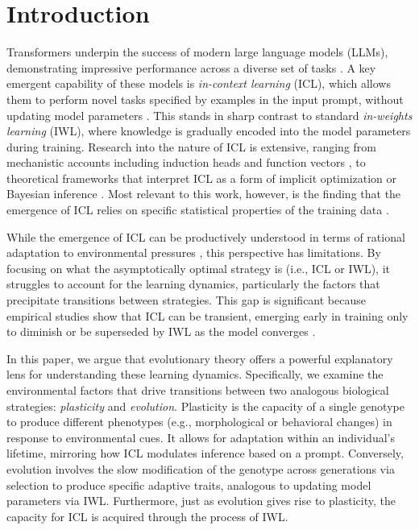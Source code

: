 \section{Introduction}

Transformers \cite{vaswani2017attention} underpin the success of modern large language models (LLMs), demonstrating impressive performance across a diverse set of tasks \cite{brown2020language}. A key emergent capability of these models is \textit{in-context learning} (ICL), which allows them to perform novel tasks specified by examples in the input prompt, without updating model parameters \cite{brown2020language, dong2022survey, liu2023pre}. This stands in sharp contrast to standard \textit{in-weights learning} (IWL), where knowledge is gradually encoded into the model parameters during training.
Research into the nature of ICL is extensive, ranging from mechanistic accounts including induction heads \cite{olsson2022context} and function vectors \cite{todd2023function}, to theoretical frameworks that interpret ICL as a form of implicit optimization or Bayesian inference \cite{von2023transformers, dai2022can, xie2021explanation}. Most relevant to this work, however, is the finding that the emergence of ICL relies on specific statistical properties of the training data \cite{chan2022data}.

While the emergence of ICL can be productively understood in terms of rational adaptation to environmental pressures \cite{wurgaft2025context}, this perspective has limitations. By focusing on what the asymptotically optimal strategy is (i.e., ICL or IWL), it struggles to account for the learning dynamics, particularly the factors that precipitate transitions between strategies. This gap is significant because empirical studies show that ICL can be transient, emerging early in training only to diminish or be superseded by IWL as the model converges \cite{singh2023transient}.

In this paper, we argue that evolutionary theory offers a powerful explanatory lens for understanding these learning dynamics. Specifically, we examine the environmental factors that drive transitions between two analogous biological strategies: \textit{plasticity} and \textit{evolution}. Plasticity is the capacity of a single genotype to produce different phenotypes (e.g., morphological or behavioral changes) in response to environmental cues. It allows for adaptation within an individual's lifetime, mirroring how ICL modulates inference based on a prompt. Conversely, evolution involves the slow modification of the genotype across generations via selection to produce specific adaptive traits, analogous to updating model parameters via IWL. Furthermore, just as evolution gives rise to plasticity, the capacity for ICL is acquired through the process of IWL.

